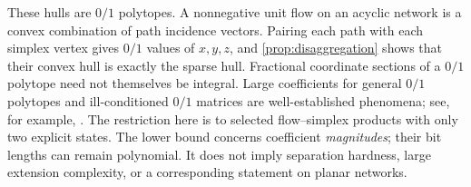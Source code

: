 These hulls are $0/1$ polytopes. A nonnegative unit flow on an acyclic
network is a convex combination of path incidence vectors. Pairing each
path with each simplex vertex gives $0/1$ values of $x,y,z$, and
\cref{prop:disaggregation} shows that their convex hull is exactly the
sparse hull. Fractional coordinate sections of a $0/1$ polytope need
not themselves be integral. Large coefficients for general $0/1$
polytopes and ill-conditioned $0/1$ matrices are well-established
phenomena; see, for example, \citet{AlonVu1997}. The restriction here
is to selected flow--simplex products with only two explicit states.
The lower bound concerns coefficient \emph{magnitudes}; their bit
lengths can remain polynomial. It does not imply separation hardness,
large extension complexity, or a corresponding statement on planar
networks.
